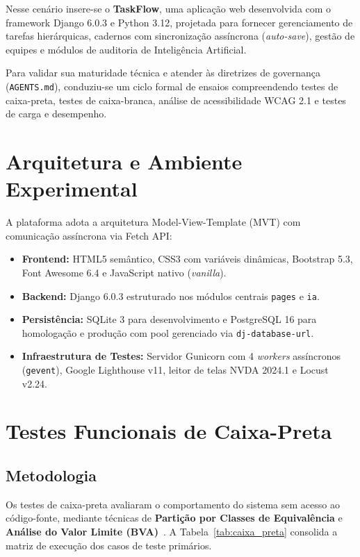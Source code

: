 \documentclass[12pt]{article}
\begin{document}
Nesse cenário insere-se o \textbf{TaskFlow}, uma aplicação web desenvolvida com o framework Django 6.0.3 e Python 3.12, projetada para fornecer gerenciamento de tarefas hierárquicas, cadernos com sincronização assíncrona (\textit{auto-save}), gestão de equipes e módulos de auditoria de Inteligência Artificial.

Para validar sua maturidade técnica e atender às diretrizes de governança (\texttt{AGENTS.md}), conduziu-se um ciclo formal de ensaios compreendendo testes de caixa-preta, testes de caixa-branca, análise de acessibilidade WCAG 2.1 e testes de carga e desempenho.

\section{Arquitetura e Ambiente Experimental}

A plataforma adota a arquitetura Model-View-Template (MVT) com comunicação assíncrona via Fetch API:
\begin{itemize}
    \item \textbf{Frontend:} HTML5 semântico, CSS3 com variáveis dinâmicas, Bootstrap 5.3, Font Awesome 6.4 e JavaScript nativo (\textit{vanilla}).
    \item \textbf{Backend:} Django 6.0.3 estruturado nos módulos centrais \texttt{pages} e \texttt{ia}.
    \item \textbf{Persistência:} SQLite 3 para desenvolvimento e PostgreSQL 16 para homologação e produção com pool gerenciado via \texttt{dj-database-url}.
    \item \textbf{Infraestrutura de Testes:} Servidor Gunicorn com 4 \textit{workers} assíncronos (\texttt{gevent}), Google Lighthouse v11, leitor de telas NVDA 2024.1 e Locust v2.24.
\end{itemize}

\section{Testes Funcionais de Caixa-Preta}

\subsection{Metodologia}
Os testes de caixa-preta avaliaram o comportamento do sistema sem acesso ao código-fonte, mediante técnicas de \textbf{Partição por Classes de Equivalência} e \textbf{Análise do Valor Limite (BVA)}~\cite{sommerville2019}. A Tabela~\ref{tab:caixa_preta} consolida a matriz de execução dos casos de teste primários.
\end{document}
